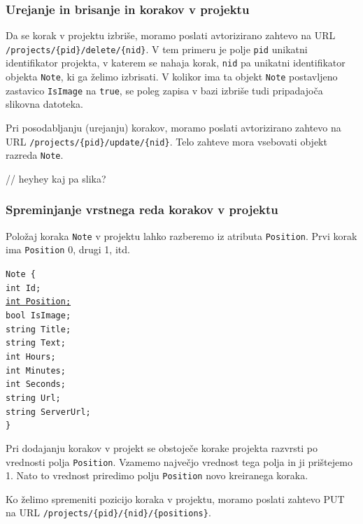 \documentclass[a4paper, 12pt]{book}
\begin{document}
\subsubsection{Urejanje in brisanje in korakov v projektu}

Da se korak v projektu izbriše, moramo poslati avtorizirano zahtevo na URL \texttt{/projects/\{pid\}/delete/\{nid\}}.
V tem primeru je polje \texttt{pid} unikatni identifikator projekta, v katerem se nahaja korak, \texttt{nid} pa unikatni identifikator objekta \texttt{Note}, ki ga želimo izbrisati.
V kolikor ima ta objekt \texttt{Note} postavljeno zastavico \texttt{IsImage} na \texttt{true}, se poleg zapisa v bazi izbriše tudi pripadajoča slikovna datoteka.

Pri posodabljanju (urejanju) korakov, moramo poslati avtorizirano zahtevo na URL \texttt{/projects/\{pid\}/update/\{nid\}}.
Telo zahteve mora vsebovati objekt razreda \texttt{Note}.

// heyhey kaj pa slika?

\subsubsection{Spreminjanje vrstnega reda korakov v projektu}

Položaj koraka \texttt{Note} v projektu lahko razberemo iz atributa \texttt{Position}.
Prvi korak ima \texttt{Position} 0, drugi 1, itd.

\noindent \texttt{Note \{ \\
int Id; \\
\underline{int Position;} \\
bool IsImage;  \\
string Title; \\
string Text; \\
int Hours; \\
int Minutes; \\
int Seconds; \\
string Url; \\
string ServerUrl; \\
\}
}

Pri dodajanju korakov v projekt se obstoječe korake projekta razvrsti po vrednosti polja \texttt{Position}.
Vzamemo največjo vrednost tega polja in ji prištejemo 1.
Nato to vrednost priredimo polju \texttt{Position} novo kreiranega koraka.

Ko želimo spremeniti pozicijo koraka v projektu, moramo poslati zahtevo PUT na URL \texttt{/projects/\{pid\}/\{nid\}/\{positions\}}.
\end{document}
